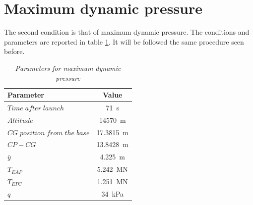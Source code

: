 \documentclass[12pt,fleqn,openany]{book} %
\begin{document}
\section{Maximum dynamic pressure}
 The second condition is that of maximum dynamic pressure. The conditions and parameters are reported in table \hypertarget{tab:maxq}{\ref{tab:maxq}}. It will be followed the same procedure seen before.
\begin{table}[h]
	\centering
	\begin{tabular}{ l c }
\toprule
Parameter					&Value 				\\
\midrule                                                                                                             
$Time\; after\; launch$			&\SI{71}{s}			\\
$Altitude$					&\SI{14570}{m}      \\
$CG\; position\; from\; the\; base$	&\SI{17.3815}{m}    \\
$CP-CG $				&\SI{13.8428}{m}    \\
$\bar{y}$ 					&\SI{4.225}{m}      \\
$T_{EAP}$						&\SI{5.242}{MN}     \\
$T_{EPC}$						&\SI{1.251}{MN}    \\
$q$							&\SI{34}{kPa}    \\
\bottomrule
\end{tabular} 
\caption{\emph{Parameters for maximum dynamic pressure}}        
\label{tab:maxq}                       
\end{table}
\end{document}

